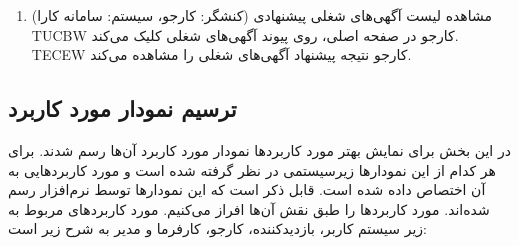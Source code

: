 \documentclass[12pt]{article}
\begin{document}
\begin{enumerate}
		\item
		مشاهده لیست آگهی‌های شغلی پیشنهادی (کنشگر: کارجو، سیستم: سامانه کارا)\\
		TUCBW کارجو در صفحه اصلی، روی پیوند آگهی‌های شغلی کلیک می‌کند.\\
		TECEW کارجو نتیجه پیشنهاد آگهی‌های شغلی را مشاهده می‌کند.\\
	\end{enumerate}

	\subsection{ترسیم نمودار مورد کاربرد}
	در این بخش برای نمایش بهتر مورد کاربردها نمودار مورد کاربرد آن‌ها رسم شدند. برای هر کدام از این نمودارها زیرسیستمی در نظر گرفته شده است و مورد کاربرد‌هایی به آن اختصاص داده شده است. قابل ذکر است که این نمودارها توسط نرم‌افزار
	رسم شده‌اند. مورد کاربرد‌ها را طبق نقش آن‌ها افراز می‌کنیم. مورد کاربردهای مربوط به زیر سیستم کاربر، بازدیدکننده، کارجو، کارفرما و مدیر به شرح زیر است:
\end{document}

